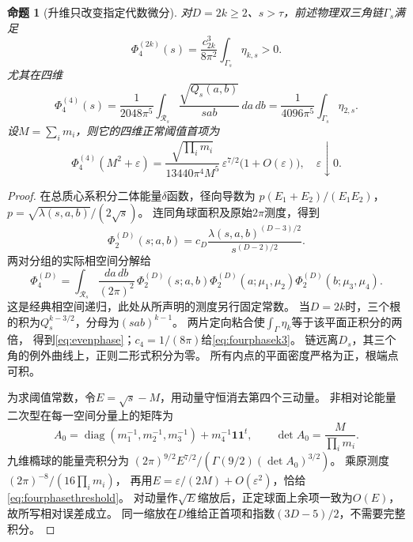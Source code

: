 \documentclass[11pt,a4paper]{ctexart}
\theoremstyle{cnplain}\newtheorem{theorem}{定理}[section]
\newtheorem{proposition}[theorem]{命题}
\theoremstyle{definition}\newtheorem{definition}[theorem]{定义}
\theoremstyle{remark}\newtheorem{remark}[theorem]{注}
\begin{document}
\begin{proposition}[升维只改变指定代数微分]\label{prop:evenphase}
对$D=2k\ge2$、$s>\tau$，前述物理双三角链$\Gamma_s$满足
\begin{equation}\label{eq:evenphase}
 \Phi_4^{(2k)}(s)=\frac{c_{2k}^3}{8\pi^2}
                         \int_{\Gamma_s}\eta_{k,s}>0.
\end{equation}
尤其在四维
\begin{equation}\label{eq:fourphasek3}
 \Phi_4^{(4)}(s)=\frac1{2048\pi^5}
       \int_{\mathcal R_s}\frac{\sqrt{Q_s(a,b)}}{sab}\,da\,db
       =\frac1{4096\pi^5}\int_{\Gamma_s}\eta_{2,s}.
\end{equation}
设$M=\sum_i m_i$，则它的四维正常阈值首项为
\begin{equation}\label{eq:fourphasethreshold}
 \Phi_4^{(4)}(M^2+\varepsilon)
 =\frac{\sqrt{\prod_i m_i}}{13440\pi^4M^5}\,
              \varepsilon^{7/2}\bigl(1+O(\varepsilon)\bigr),\quad\varepsilon\downarrow0.
\end{equation}
\end{proposition}
\begin{proof}
在总质心系积分二体能量$\delta$函数，径向导数为
$p(E_1+E_2)/(E_1E_2)$，$p=\sqrt{\lambda(s,a,b)}/(2\sqrt s)$。
连同角球面积及原始$2\pi$测度，得到
\[
 \Phi_2^{(D)}(s;a,b)=c_D
            \frac{\lambda(s,a,b)^{(D-3)/2}}{s^{(D-2)/2}}.
\]
两对分组的实际相空间分解给
\[
 \Phi_4^{(D)}=
 \int_{\mathcal R_s}\frac{da\,db}{(2\pi)^2}\,
 \Phi_2^{(D)}(s;a,b)\Phi_2^{(D)}(a;\mu_1,\mu_2)
                         \Phi_2^{(D)}(b;\mu_3,\mu_4).
\]
这是经典相空间递归\cite{KreimerBanana,PDGphase}，此处从所声明的测度另行固定常数。
当$D=2k$时，三个根的积为$Q_s^{k-3/2}$，分母为$(sab)^{k-1}$。
两片定向粘合使$\int_{\Gamma}\eta_k$等于该平面正积分的两倍，
得到\eqref{eq:evenphase}；$c_4=1/(8\pi)$给\eqref{eq:fourphasek3}。
链远离$D_s$，其三个角的例外曲线上，正则二形式积分为零。
所有内点的平面密度严格为正，根端点可积。

为求阈值常数，令$E=\sqrt s-M$，用动量守恒消去第四个三动量。
非相对论能量二次型在每一空间分量上的矩阵为
\[
 A_0=\operatorname{diag}(m_1^{-1},m_2^{-1},m_3^{-1})
                         +m_4^{-1}\mathbf1\mathbf1^t,
 \qquad\det A_0=\frac{M}{\prod_i m_i}.
\]
九维橢球的能量壳积分为
$(2\pi)^{9/2}E^{7/2}/(\Gamma(9/2)(\det A_0)^{3/2})$。
乘原测度$(2\pi)^{-8}/(16\prod_i m_i)$，
再用$E=\varepsilon/(2M)+O(\varepsilon^2)$，恰给\eqref{eq:fourphasethreshold}。
对动量作$\sqrt E$缩放后，正定球面上余项一致为$O(E)$，故所写相对误差成立。
同一缩放在$D$维给正首项和指数$(3D-5)/2$，不需要完整积分。
\end{proof}
\end{document}
